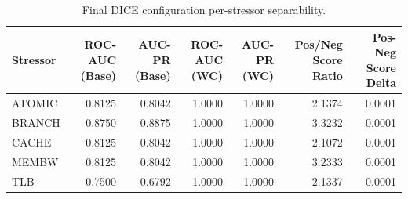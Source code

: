 \begin{table}[t]
\centering
\caption{Final DICE configuration per-stressor separability.}
\label{tab:dice_full_stressor}
\footnotesize
\begin{tabular}{lrrrrrr}
\toprule
Stressor & ROC-AUC (Base) & AUC-PR (Base) & ROC-AUC (WC) & AUC-PR (WC) & Pos/Neg Score Ratio & Pos-Neg Score Delta \\
\midrule
ATOMIC & 0.8125 & 0.8042 & 1.0000 & 1.0000 & 2.1374 & 0.0001 \\
BRANCH & 0.8750 & 0.8875 & 1.0000 & 1.0000 & 3.3232 & 0.0001 \\
CACHE & 0.8125 & 0.8042 & 1.0000 & 1.0000 & 2.1072 & 0.0001 \\
MEMBW & 0.8125 & 0.8042 & 1.0000 & 1.0000 & 3.2333 & 0.0001 \\
TLB & 0.7500 & 0.6792 & 1.0000 & 1.0000 & 2.1337 & 0.0001 \\
\bottomrule
\end{tabular}

\end{table}
